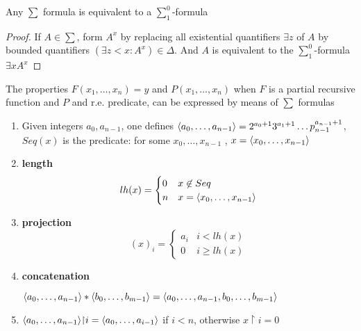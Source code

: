 \documentclass[11pt]{article}
\begin{document}
\begin{proposition}[]
Any \(\sum\) formula is equivalent to a \(\sum_1^0\)-formula
\end{proposition}

\begin{proof}
If \(A\in\sum\), form \(A^x\) by replacing all existential quantifiers \(\exists z\)
of \(A\) by bounded quantifiers \((\exists z<x:A^x)\in\Delta\). And \(A\) is equivalent
to the \(\sum_1^0\)-formula \(\exists xA^x\)
\end{proof}

\begin{theorem}[]
The properties \(F(x_1,\dots,x_n)=y\) and \(P(x_1,\dots,x_n)\) when \(F\) is a partial
recursive function and \(P\) and r.e. predicate, can be expressed by means of \(\sum\)
formulas 
\end{theorem}

\begin{definition}[]
\begin{enumerate}
\item Given integers \(a_0,a_{n-1}\), one defines \(\langle
   a_0,\dots,a_{n-1}\rangle=2^{a_0+1}3^{a_1+1}\dots p_{n-1}^{a_{n-1}+1}\), \(Seq(x)\)
is the predicate: for some
\(x_0,\dots,x_{n-1}\) , \(x=\langle x_0,\dots,x_{n-1}\rangle\)
\item \textbf{length}
\begin{equation*}
lh(x)=
\begin{cases}
0&x\not\in Seq\\
n&x=\langle x_0,\dots,x_{n-1}\rangle
\end{cases}
\end{equation*}

\item \textbf{projection}
\begin{equation*}
(x)_i=
\begin{cases}
a_i&i<lh(x)\\
0&i\ge lh(x)
\end{cases}
\end{equation*}
\item \textbf{concatenation}

\(\langle a_0,\dots,a_{n-1}\rangle*\langle b_0,\dots,b_{m-1}\rangle=\langle a_0,\dots,a_{n-1},b_0,\dots,b_{m-1}\rangle\)
\item \(\langle a_0,\dots,a_{n-1}\rangle\mathord{\upharpoonright} i=\langle a_0,\dots,a_{i-1}\rangle\) if \(i<n\),
otherwise \(x\restriction i=0\)
\end{enumerate}
\end{definition}
\end{document}

